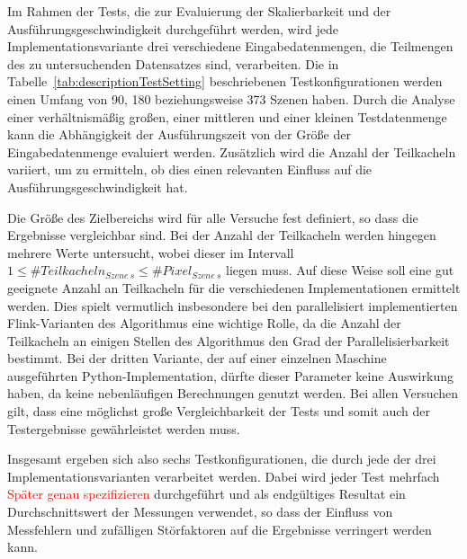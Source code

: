 Im Rahmen der Tests, die zur Evaluierung der Skalierbarkeit und der Ausführungsgeschwindigkeit durchgeführt werden, wird jede Implementationsvariante drei verschiedene Eingabedatenmengen, die Teilmengen des zu untersuchenden Datensatzes sind, verarbeiten. Die in Tabelle~\ref{tab:descriptionTestSetting} beschriebenen Testkonfigurationen werden einen Umfang von 90, 180 beziehungsweise 373 Szenen haben. Durch die Analyse einer verhältnismäßig großen, einer mittleren und einer kleinen Testdatenmenge kann die Abhängigkeit der Ausführungszeit von der Größe der Eingabedatenmenge evaluiert werden. Zusätzlich wird die Anzahl der Teilkacheln variiert, um zu ermitteln, ob dies einen relevanten Einfluss auf die Ausführungsgeschwindigkeit hat. 

Die Größe des Zielbereichs wird für alle Versuche fest definiert, so dass die Ergebnisse vergleichbar sind. Bei der Anzahl der Teilkacheln werden hingegen mehrere Werte untersucht, wobei dieser im Intervall \(1 \leq \mathbin{\#}Teilkacheln_{Szene\ s} \leq \mathbin{\#} Pixel_{Szene\ s} \) liegen muss. Auf diese Weise soll eine gut geeignete Anzahl an Teilkacheln für die verschiedenen Implementationen ermittelt werden. Dies spielt vermutlich insbesondere bei den parallelisiert implementierten Flink-Varianten des Algorithmus eine wichtige Rolle, da die Anzahl der Teilkacheln an einigen Stellen des Algorithmus den Grad der Parallelisierbarkeit bestimmt. Bei der dritten Variante, der auf einer einzelnen Maschine ausgeführten Python-Implementation, dürfte dieser Parameter keine Auswirkung haben, da keine nebenläufigen Berechnungen genutzt werden. Bei allen Versuchen gilt, dass eine möglichst große Vergleichbarkeit der Tests und somit auch der Testergebnisse gewährleistet werden muss.

 Insgesamt ergeben sich also sechs Testkonfigurationen, die durch jede der drei Implementationsvarianten verarbeitet werden. Dabei wird jeder Test mehrfach \textcolor{red}{Später genau spezifizieren} durchgeführt und als endgültiges Resultat ein Durchschnittswert der Messungen verwendet, so dass der Einfluss von Messfehlern und zufälligen Störfaktoren auf die Ergebnisse verringert werden kann. 

